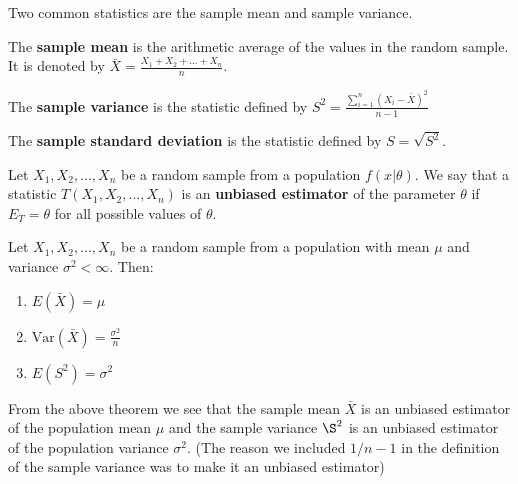 Two common statistics are the sample mean and sample variance.

\begin{defn}
    The \textbf{sample mean} is the arithmetic average of the values in the random sample. It is denoted by $\bar{X} = \displaystyle \frac{X_1 + X_2 + ... + X_n}{n}$.

    The \textbf{sample variance} is the statistic defined by $S^2 = \displaystyle \frac{\sum_{i=1}^n \left (X_i - \bar{X}\right )^2}{n-1}$

    The \textbf{sample standard deviation} is the statistic defined by $S = \sqrt{S^2}$.
\end{defn}

\begin{defn}
    Let $X_1, X_2, ..., X_n$ be a random sample from a population $f\left (x| \theta\right )$. We say that a statistic $T\left (X_1, X_2, ...,X_n\right )$ is an \textbf{unbiased estimator} of the parameter $\theta$ if $E_T = \theta$ for all possible values of $\theta$.
\end{defn}

\begin{thm}
    Let $X_1, X_2, ..., X_n$ be a random sample from a population with mean $\mu $ and variance $\sigma ^2 < \infty$. Then:
    \begin{enumerate}
        \item $E\left (\bar{X}\right ) = \mu $
        \item $\text{Var}\left (\bar{X}\right ) = \frac{\sigma ^2}{n}$
        \item $E\left (S ^2\right ) = \sigma ^2$
    \end{enumerate}
\end{thm}

From the above theorem we see that the sample mean $\bar{X}$ is an unbiased estimator of the population mean $\mu$ and the sample variance $\S^2$ is an unbiased estimator of the population variance $\sigma^2$. (The reason we included $1/n-1$ in the  definition of the sample variance was to make it an unbiased estimator)


